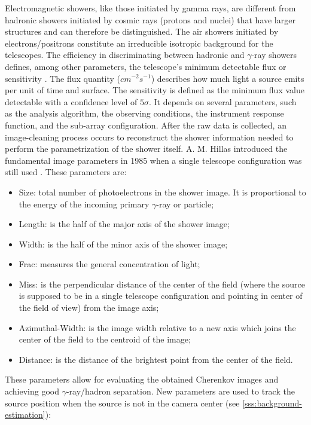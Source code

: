 Electromagnetic showers, like those initiated by gamma rays, are different from hadronic showers initiated by cosmic rays (protons and nuclei) that have larger structures and can therefore be distinguished. The air showers initiated by electrons/positrons constitute an irreducible isotropic background for the telescopes. The efficiency in discriminating between hadronic and $\gamma$-ray showers defines, among other parameters, the telescope's minimum detectable flux or sensitivity \cite{tampieri2020real}. 
The flux quantity ($cm^{-2} s^{-1}$) describes how much light a source emits per unit of time and surface. The sensitivity is defined as the minimum flux value detectable with a confidence level of $5\sigma$. It depends on several parameters, such as the analysis algorithm, the observing conditions, the instrument response function, and the sub-array configuration. After the raw data is collected, an image-cleaning process occurs to reconstruct the shower information needed to perform the parametrization of the shower itself. A. M. Hillas introduced the fundamental image parameters in 1985 when a single telescope configuration was still used \cite{hillas1985cerenkov}. These parameters are:
\begin{itemize}
    \item Size: total number of photoelectrons in the shower image. It is proportional to the energy of the incoming primary $\gamma$-ray or particle;
    \item Length: is the half of the major axis of the shower image;
    \item Width: is the half of the minor axis of the shower image;
    \item Frac: measures the general concentration of light;
    \item Miss: is the perpendicular distance of the center of the field (where the source is supposed to be in a single telescope configuration and pointing in center of the field of view) from the image axis;
    \item Azimuthal-Width: is the image width relative to a new axis which
joins the center of the field to the centroid of the image; 
    \item Distance: is the distance of the brightest point from the center of the
field.
\end{itemize}
These parameters allow for evaluating the obtained Cherenkov images and achieving good $\gamma$-ray/hadron separation. 
New parameters are used to track the source position when the source is not in the camera center (see \autoref{sss:background-estimation}):
